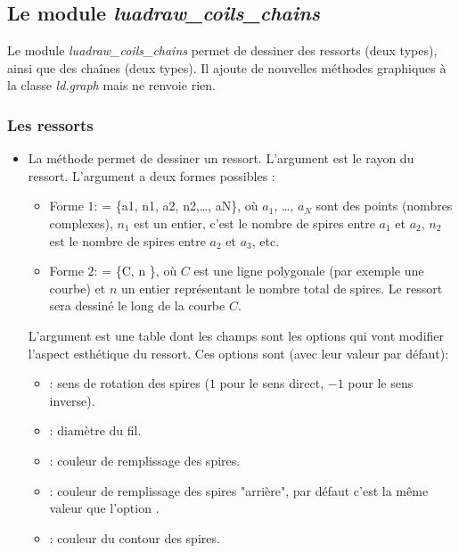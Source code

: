 \subsection{Le module \emph{luadraw\_coils\_chains}}

Le module \emph{luadraw\_coils\_chains} permet de dessiner des ressorts (deux types), ainsi que des chaînes (deux types). Il ajoute de nouvelles méthodes graphiques à la classe \emph{ld.graph} mais ne renvoie rien.

\subsubsection{Les ressorts}

    \begin{itemize}
        \item La méthode  permet de dessiner un ressort. L'argument  est le rayon du ressort. L'argument  a deux formes possibles :
            \begin{itemize}
                \item Forme $1$:  = \{a1, n1, a2, n2,\ldots, aN\}, où $a_1$, \ldots, $a_N$ sont des points (nombres complexes), $n_1$ est un entier, c'est le nombre de spires entre $a_1$ et $a_2$, $n_2$ est le nombre de spires entre $a_2$ et $a_3$, etc.
                \item Forme $2$:  = \{C, n \}, où $C$ est une ligne polygonale (par exemple une courbe) et $n$ un entier représentant le nombre total de spires. Le ressort sera dessiné le long de la courbe $C$.
            \end{itemize}
        L'argument  est une table dont les champs sont les options qui vont modifier l'aspect esthétique du ressort. Ces options sont (avec leur valeur par défaut):
        \begin{itemize}
            \item {} : sens de rotation des spires ($1$ pour le sens direct, $-1$ pour le sens inverse).
            \item {} : diamètre du fil.
            \item {} : couleur de remplissage des spires.
            \item {} : couleur de remplissage des spires "arrière", par défaut c'est la même valeur que l'option .
            \item {} : couleur du contour des spires.

\end{itemize}
\end{itemize}
